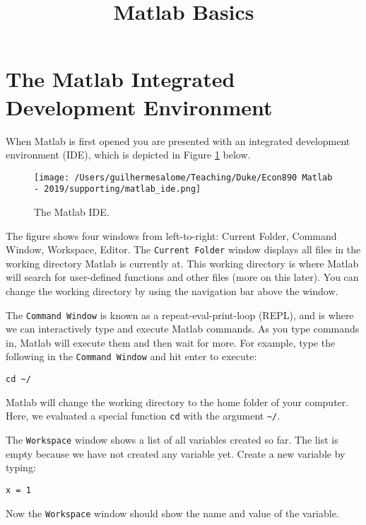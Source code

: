 \documentclass[12pt, a4paper]{article}
\date{}
\title{Matlab Basics}
\begin{document}
\maketitle
\section{The Matlab Integrated Development Environment}
\label{sec:orgad76206}
When Matlab is first opened you are presented with an integrated development environment (IDE), which is depicted in Figure \ref{fig:orgc7f2154} below.

\begin{figure}[!ht]
\centering
\texttt{[image: /Users/guilhermesalome/Teaching/Duke/Econ890 Matlab - 2019/supporting/matlab\_ide.png]}
\caption{\label{fig:orgc7f2154}
The Matlab IDE.}
\end{figure}

The figure shows four windows from left-to-right: Current Folder, Command Window, Workspace, Editor.
The \texttt{Current Folder} window displays all files in the working directory Matlab is currently at.
This working directory is where Matlab will search for user-defined functions and other files (more on this later).
You can change the working directory by using the navigation bar above the window.

The \texttt{Command Window} is known as a repeat-eval-print-loop (REPL), and is where we can interactively type and execute Matlab commands.
As you type commands in, Matlab will execute them and then wait for more.
For example, type the following in the \texttt{Command Window} and hit enter to execute:
\lstset{language=matlab,label= ,caption= ,captionpos=b,firstnumber=1,numbers=left,style=Matlab-editor}
\begin{lstlisting}
cd ~/
\end{lstlisting}
Matlab will change the working directory to the home folder of your computer.
Here, we evaluated a special function \texttt{cd} with the argument \texttt{\textasciitilde{}/}.

The \texttt{Workspace} window shows a list of all variables created so far.
The list is empty because we have not created any variable yet.
Create a new variable by typing:
\lstset{language=matlab,label= ,caption= ,captionpos=b,firstnumber=1,numbers=left,style=Matlab-editor}
\begin{lstlisting}
x = 1
\end{lstlisting}
Now the \texttt{Workspace} window should show the name and value of the variable.
\end{document}
